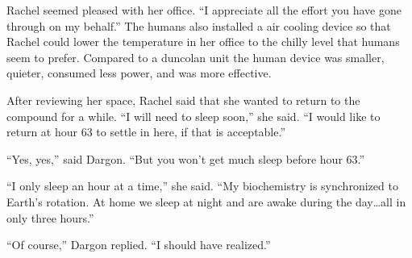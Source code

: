 Rachel seemed pleased with her office. ``I appreciate all the effort you have gone through on my
behalf.'' The humans also installed a air cooling device so that Rachel could lower the
temperature in her office to the chilly level that humans seem to prefer. Compared to a duncolan
unit the human device was smaller, quieter, consumed less power, and was more effective.

After reviewing her space, Rachel said that she wanted to return to the compound for a while.
``I will need to sleep soon,'' she said. ``I would like to return at hour 63 to settle in here,
if that is acceptable.''

``Yes, yes,'' said Dargon. ``But you won't get much sleep before hour 63.''

``I only sleep an hour at a time,'' she said. ``My biochemistry is synchronized to Earth's
rotation. At home we sleep at night and are awake during the day\ldots all in only three
hours.''

``Of course,'' Dargon replied. ``I should have realized.''
